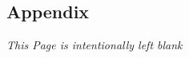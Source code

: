 \documentclass[oneside,openany,obeyspaces]{book}
\begin{document}
\begin{flushleft}

    \chapter{Appendix}

    \vspace{1.5cm}
    \begin{center}
        \textit{This Page is intentionally left blank}
    \end{center}
    \newpage


\end{flushleft}
\end{document}

